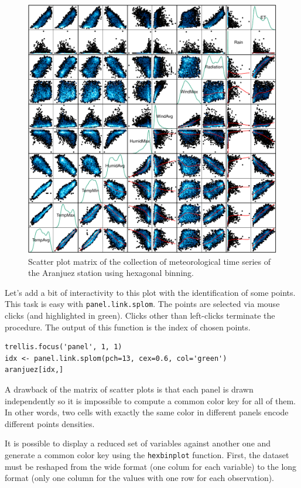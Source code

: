 \begin{figure}[htb]
\centering
\includegraphics[width=.9\linewidth]{figs/aranjuezSplomHexbin.pdf}
\caption{\label{fig:aranjuezSplomHexbin}Scatter plot matrix of the collection of meteorological time series of the Aranjuez station using hexagonal binning.}
\end{figure}

Let's add a bit of interactivity to this plot with the
identification of some points. This task is easy with
\texttt{panel.link.splom}. The points are selected via mouse clicks (and
highlighted in green). Clicks other than left-clicks terminate the
procedure. The output of this function is the index of chosen points.


\lstset{language=R}
\begin{lstlisting}
trellis.focus('panel', 1, 1)
idx <- panel.link.splom(pch=13, cex=0.6, col='green')
aranjuez[idx,]
\end{lstlisting}


A drawback of the matrix of scatter plots is that each panel is drawn
independently so it is impossible to compute a common color key
for all of them. In other words, two cells with exactly the same
color in different panels encode different points densities. 

It is possible to display a reduced set of variables against
another one and generate a common color key using the \texttt{hexbinplot}
function. First, the dataset must be reshaped from the wide format
(one colum for each variable) to the long format (only one column for
the values with one row for each observation). 

